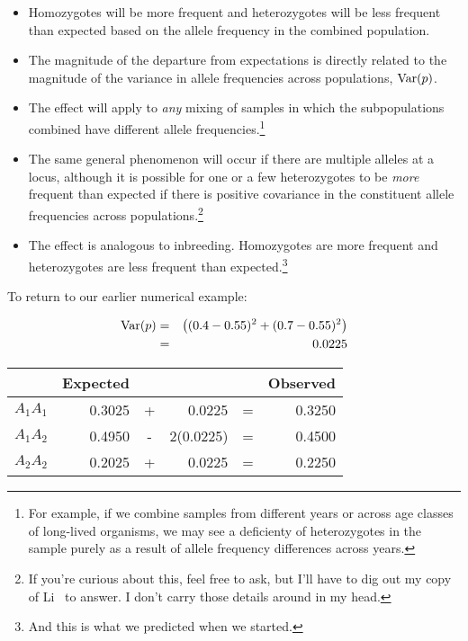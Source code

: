 \documentclass[12pt]{article}
\begin{document}
\begin{itemize}

\item Homozygotes will be more frequent and heterozygotes will be less
  frequent than expected based on the allele frequency in the combined
  population.

\item The magnitude of the departure from expectations is directly
  related to the magnitude of the variance in allele frequencies
  across populations, $\hbox{Var}(p)$.

\item The effect will apply to {\it any\/} mixing of samples in which
  the subpopulations combined have different allele
  frequencies.\footnote{For example, if we combine samples from
    different years or across age classes of long-lived organisms, we
    may see a deficienty of heterozygotes in the sample purely as a
    result of allele frequency differences across years.}

\item The same general phenomenon will occur if there are multiple
  alleles at a locus, although it is possible for one or a few
  heterozygotes to be {\it more\/} frequent than expected if there is
  positive covariance in the constituent allele frequencies across
  populations.\footnote{If you're curious about this, feel free to
    ask, but I'll have to dig out my copy of Li~\cite{Li-1976} to
    answer. I don't carry those details around in my head.}

\item The effect is analogous to inbreeding. Homozygotes are more
  frequent and heterozygotes are less frequent than
  expected.\footnote{And this is what we predicted when we started.}

\end{itemize}

To return to our earlier numerical example:

\begin{eqnarray}
\hbox{Var}(p) &=& \left((0.4 - 0.55)^2 + (0.7 - 0.55)^2\right) \\
              &=& 0.0225
\end{eqnarray}
\begin{center}
\begin{tabular}{l|rcrcr}
\hline\hline
         & Expected &   &           &   & Observed \\
\hline
$A_1A_1$ &   0.3025 & + &   0.0225  & = &   0.3250 \\
$A_1A_2$ &   0.4950 & - & 2(0.0225) & = &   0.4500 \\
$A_2A_2$ &   0.2025 & + &   0.0225  & = &   0.2250 \\
\hline
\end{tabular}
\end{center}
\end{document}
